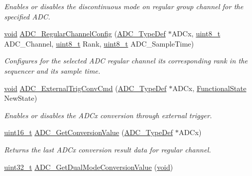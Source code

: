 \begin{DoxyCompactItemize}
\begin{DoxyCompactList}\small\item\em Enables or disables the discontinuous mode on regular group channel for the specified A\+DC. \end{DoxyCompactList}\item 
\hyperlink{usb__devapi_8h_afabf60e7f57651d6d595a02c75f07cd0}{void} \hyperlink{group___a_d_c___private___functions_gac531adb577b648d4bb8881f2ed627d52}{A\+D\+C\+\_\+\+Regular\+Channel\+Config} (\hyperlink{struct_a_d_c___type_def}{A\+D\+C\+\_\+\+Type\+Def} $\ast$A\+D\+Cx, \hyperlink{_p_e___types_8h_aba7bc1797add20fe3efdf37ced1182c5}{uint8\+\_\+t} A\+D\+C\+\_\+\+Channel, \hyperlink{_p_e___types_8h_aba7bc1797add20fe3efdf37ced1182c5}{uint8\+\_\+t} Rank, \hyperlink{_p_e___types_8h_aba7bc1797add20fe3efdf37ced1182c5}{uint8\+\_\+t} A\+D\+C\+\_\+\+Sample\+Time)
\begin{DoxyCompactList}\small\item\em Configures for the selected A\+DC regular channel its corresponding rank in the sequencer and its sample time. \end{DoxyCompactList}\item 
\hyperlink{usb__devapi_8h_afabf60e7f57651d6d595a02c75f07cd0}{void} \hyperlink{group___a_d_c___private___functions_ga3ae92d7940a16c898223374a5857f509}{A\+D\+C\+\_\+\+External\+Trig\+Conv\+Cmd} (\hyperlink{struct_a_d_c___type_def}{A\+D\+C\+\_\+\+Type\+Def} $\ast$A\+D\+Cx, \hyperlink{agilefox_2library_2inc_2stm32f10x__type_8h_ac9a7e9a35d2513ec15c3b537aaa4fba1}{Functional\+State} New\+State)
\begin{DoxyCompactList}\small\item\em Enables or disables the A\+D\+Cx conversion through external trigger. \end{DoxyCompactList}\item 
\hyperlink{_p_e___types_8h_a1f1825b69244eb3ad2c7165ddc99c956}{uint16\+\_\+t} \hyperlink{group___a_d_c___private___functions_gaaf74221c285ec5dab5e66baf7bec6bd3}{A\+D\+C\+\_\+\+Get\+Conversion\+Value} (\hyperlink{struct_a_d_c___type_def}{A\+D\+C\+\_\+\+Type\+Def} $\ast$A\+D\+Cx)
\begin{DoxyCompactList}\small\item\em Returns the last A\+D\+Cx conversion result data for regular channel. \end{DoxyCompactList}\item 
\hyperlink{_p_e___types_8h_a33594304e786b158f3fb30289278f5af}{uint32\+\_\+t} \hyperlink{group___a_d_c___private___functions_gac5a4792dc29ef7ff6bfbce9f37e8a668}{A\+D\+C\+\_\+\+Get\+Dual\+Mode\+Conversion\+Value} (\hyperlink{usb__devapi_8h_afabf60e7f57651d6d595a02c75f07cd0}{void})

\end{DoxyCompactItemize}
